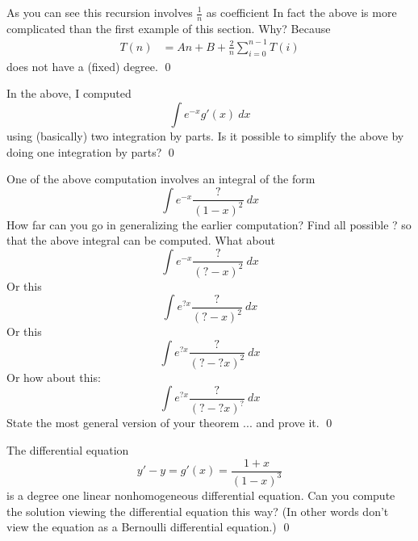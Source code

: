 As you can see this recursion involves $\frac{1}{n}$ as coefficient
In fact the above is more complicated than the first example of this section.
Why? Because
\begin{align*}
T(n)
&= An + B + \frac{2}{n}\sum_{i=0}^{n-1} T(i)
\end{align*}
does not have a (fixed) degree.
\qed

\newpage
\begin{ex}
  In the above, I computed
  \[
  \int e^{-x} g'(x) \ dx 
  \]
  using (basically) two integration by parts.
  Is it possible to simplify the above
  by doing one integration by parts?
  \qed
\end{ex}


\newpage
\begin{ex}
  One of the above computation involves an integral of the form
  \[
  \int e^{-x} \frac{\text{?}}{(1-x)^2} \ dx
  \]
  How far can you go in generalizing the earlier computation?
  Find all possible ? so that the above integral
  can be computed.
  What about
  \[
  \int e^{-x} \frac{\text{?}}{(?-x)^2} \ dx
  \]
  Or this
  \[
  \int e^{?x} \frac{\text{?}}{(?-x)^2} \ dx
  \]
  Or this
  \[
  \int e^{?x} \frac{\text{?}}{(?-?x)^2} \ dx
  \]
  Or how about this:
  \[
  \int e^{?x} \frac{\text{?}}{(?-?x)^?} \ dx
  \]
  State the most general version of your theorem ... and prove it.
  \qed
\end{ex}


\newpage
\begin{ex}
  The differential equation
  \[
  y' - y = g'(x) = \frac{1+x}{(1-x)^3}
  \]
  is a degree one linear nonhomogeneous differential equation.
  Can you compute the solution viewing the differential equation this way?
  (In other words don't view the equation as a Bernoulli differential
  equation.)
  \qed
\end{ex}





